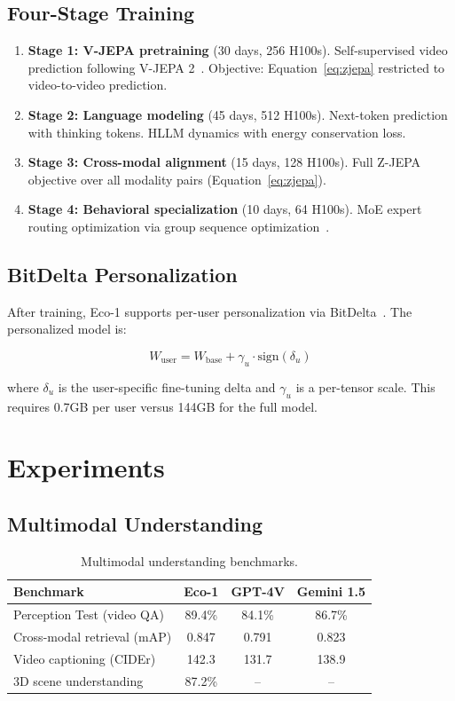 \documentclass[11pt,letterpaper]{article}
\begin{document}
\subsection{Four-Stage Training}

\begin{enumerate}
    \item \textbf{Stage 1: V-JEPA pretraining} (30 days, 256 H100s). Self-supervised video prediction following V-JEPA 2~\cite{bardes2025vjepa2}. Objective: Equation~\ref{eq:zjepa} restricted to video-to-video prediction.
    \item \textbf{Stage 2: Language modeling} (45 days, 512 H100s). Next-token prediction with thinking tokens. HLLM dynamics with energy conservation loss.
    \item \textbf{Stage 3: Cross-modal alignment} (15 days, 128 H100s). Full Z-JEPA objective over all modality pairs (Equation~\ref{eq:zjepa}).
    \item \textbf{Stage 4: Behavioral specialization} (10 days, 64 H100s). MoE expert routing optimization via group sequence optimization~\cite{zoo_hllm}.
\end{enumerate}

\subsection{BitDelta Personalization}

After training, Eco-1 supports per-user personalization via BitDelta~\cite{liu2024bitdelta}. The personalized model is:

\begin{equation}
W_{\text{user}} = W_{\text{base}} + \gamma_u \cdot \text{sign}(\delta_u)
\end{equation}

where $\delta_u$ is the user-specific fine-tuning delta and $\gamma_u$ is a per-tensor scale. This requires 0.7GB per user versus 144GB for the full model.

\section{Experiments}

\subsection{Multimodal Understanding}

\begin{table}[t]
\centering
\begin{tabular}{lccc}
\toprule
\textbf{Benchmark} & \textbf{Eco-1} & \textbf{GPT-4V} & \textbf{Gemini 1.5} \\
\midrule
Perception Test (video QA) & 89.4\% & 84.1\% & 86.7\% \\
Cross-modal retrieval (mAP) & 0.847 & 0.791 & 0.823 \\
Video captioning (CIDEr) & 142.3 & 131.7 & 138.9 \\
3D scene understanding & 87.2\% & -- & -- \\
\bottomrule
\end{tabular}
\caption{Multimodal understanding benchmarks.}
\label{tab:multimodal}
\end{table}
\end{document}
